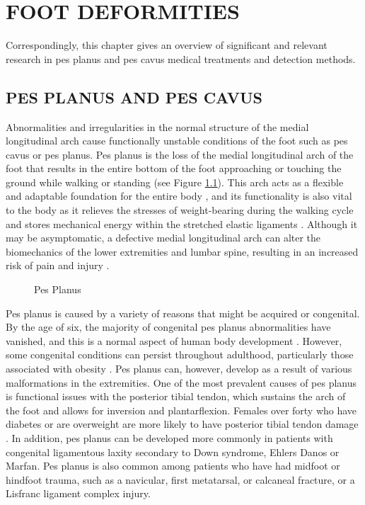 \chapter{FOOT DEFORMITIES}\label{chp:Feet Deformities}

Correspondingly, this chapter gives an overview of significant and relevant research in pes planus and pes cavus medical treatments and detection methods.

\section{PES PLANUS AND PES CAVUS}

Abnormalities and irregularities in the normal structure of the medial longitudinal arch cause functionally unstable conditions of the foot such as pes cavus or pes planus. Pes planus is the loss of the medial longitudinal arch of the foot that results in the entire bottom of the foot approaching or touching the ground while walking or standing \cite{wozniacka2013body} (see Figure \ref{fig:BackgroundPesPlanus}). This arch acts as a flexible and adaptable foundation for the entire body \cite{kohls2009prevalence}, and its functionality is also vital to the body as it relieves the stresses of weight-bearing during the walking cycle and stores mechanical energy within the stretched elastic ligaments \cite{da1963idiopathic}. Although it may be asymptomatic, a defective medial longitudinal arch can alter the biomechanics of the lower extremities and lumbar spine, resulting in an increased risk of pain and injury \cite{gun2012pes}.

\begin{figure}[htbp]
\centering
{}
\caption{Pes Planus \cite{kim2021dynamic}}
\label{fig:BackgroundPesPlanus}
\end{figure}

Pes planus is caused by a variety of reasons that might be acquired or congenital. By the age of six, the majority of congenital pes planus abnormalities have vanished, and this is a normal aspect of human body development \cite{Mickle2006TheFO}. However, some congenital conditions can persist throughout adulthood, particularly those associated with obesity \cite{Woniacka2013BodyWA}. Pes planus can, however, develop as a result of various malformations in the extremities. One of the most prevalent causes of pes planus is functional issues with the posterior tibial tendon, which sustains the arch of the foot and allows for inversion and plantarflexion. Females over forty who have diabetes or are overweight are more likely to have posterior tibial tendon damage \cite{KohlsGatzoulis2009ThePO}. In addition, pes planus can be developed more commonly in patients with congenital ligamentous laxity secondary to Down syndrome, Ehlers Danos or Marfan. Pes planus is also common among patients who have had midfoot or hindfoot trauma, such as a navicular, first metatarsal, or calcaneal fracture, or a Lisfranc ligament complex injury.

